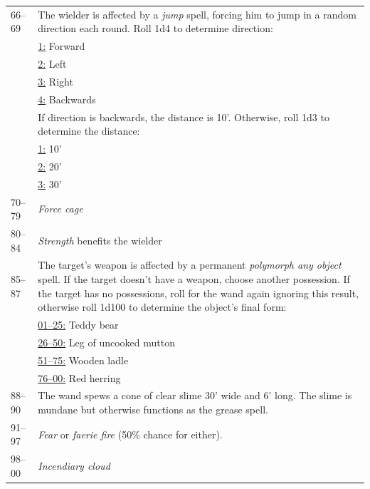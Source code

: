 \begin{longtable}{|p{}|p{}|}
\rowcolor[gray]{.9}66--69	& The wielder is affected by a \textit{jump} spell, forcing him to jump in a random direction each round.  Roll 1d4 to determine direction: \\
\rowcolor[gray]{.9}		& \underline{1:} Forward \\
\rowcolor[gray]{.9}		& \underline{2:} Left \\
\rowcolor[gray]{.9}		& \underline{3:} Right \\
\rowcolor[gray]{.9}		& \underline{4:} Backwards \\
\rowcolor[gray]{.9}		& If direction is backwards, the distance is 10'.  Otherwise, roll 1d3 to determine the distance: \\
\rowcolor[gray]{.9}		& \underline{1:} 10' \\
\rowcolor[gray]{.9}		& \underline{2:} 20' \\
\rowcolor[gray]{.9}		& \underline{3:} 30' \\
70--79	& \textit{Force cage} \\
\rowcolor[gray]{.9}80--84	& \textit{Strength} benefits the wielder \\
85--87	& The target's weapon is affected by a permanent \textit{polymorph any object} spell.  If the target doesn't have a weapon, choose another possession.  If the target has no possessions, roll for the wand again ignoring this result, otherwise roll 1d100 to determine the object's final form: \\
		& \underline{01--25:} Teddy bear \\
		& \underline{26--50:} Leg of uncooked mutton \\
		& \underline{51--75:} Wooden ladle \\
		& \underline{76--00:} Red herring \\
\rowcolor[gray]{.9}88--90	& The wand spews a cone of clear slime 30' wide and 6' long.  The slime is mundane but otherwise functions as the grease spell. \\
91--97	& \textit{Fear} or \textit{faerie fire} (50\% chance for either). \\
\rowcolor[gray]{.9}98--00	& \textit{Incendiary cloud} \\
\end{longtable}

